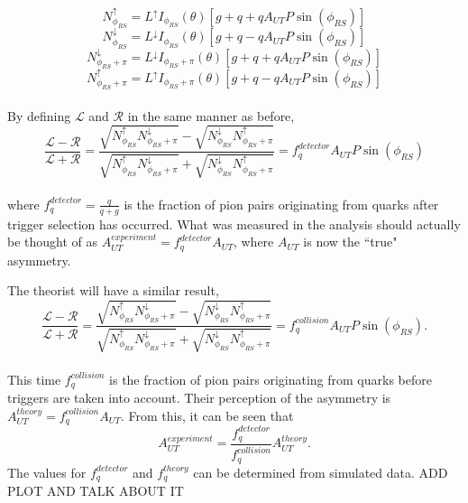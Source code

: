 \documentclass[letterpaper, abstract = on,listof=totoc, bibliography=totoc]{scrreprt}
\begin{document}
\begin{appendices}
\begin{equation}
\label{eq:nupTB}
N^\uparrow_{\phi_{RS}} = L^\uparrow I_{\phi_{RS}}(\theta)\left[g+q+qA_{UT}P\sin(\phi_{RS})\right]
\end{equation}
\begin{equation}
\label{eq:ndwnTB}
N^\downarrow_{\phi_{RS}} = L^\downarrow I_{\phi_{RS}}(\theta)\left[g+q-qA_{UT}P\sin(\phi_{RS})\right]
\end{equation}
\begin{equation}
\label{eq:ndwnphiTB}
N^\downarrow_{\phi_{RS}+\pi} = L^\downarrow I_{\phi_{RS}+\pi}(\theta)\left[g+q+qA_{UT}P\sin(\phi_{RS})\right]
\end{equation}
\begin{equation}
\label{eq:nupphiTB}
N^\uparrow_{\phi_{RS}+\pi} = L^\uparrow I_{\phi_{RS}+\pi}(\theta)\left[g+q-qA_{UT}P\sin(\phi_{RS})\right]
\end{equation}\\
By defining $\mathcal{L}$ and $\mathcal{R}$ in the same manner as before, 
\begin{equation}
\label{eq:crossRatioTB}
\frac{\mathcal{L} - \mathcal{R}}{\mathcal{L} +\mathcal{R}} = \frac{\sqrt{N^\uparrow_{\phi_{RS}}N^\downarrow_{\phi_{RS}+\pi}} - \sqrt{N^\downarrow_{\phi_{RS}}N^\uparrow_{\phi_{RS}+\pi}}}{\sqrt{N^\uparrow_{\phi_{RS}}N^\downarrow_{\phi_{RS}+\pi}} + \sqrt{N^\downarrow_{\phi_{RS}}N^\uparrow_{\phi_{RS}+\pi}}} =f_q^{detector}A_{UT}P\sin(\phi_{RS})
\end{equation}\\
where $f_q^{detector} = \frac{q}{q+g}$ is the fraction of pion pairs originating from quarks after trigger selection has occurred. What was measured in the analysis should actually be thought of as $A_{UT}^{experiment} = f_q^{detector}A_{UT}$, where $A_{UT}$ is now the ``true" asymmetry. 

The theorist will have a similar result,
\begin{equation}
\label{eq:crossRatioTBTh}
\frac{\mathcal{L} - \mathcal{R}}{\mathcal{L} +\mathcal{R}} = \frac{\sqrt{N^\uparrow_{\phi_{RS}}N^\downarrow_{\phi_{RS}+\pi}} - \sqrt{N^\downarrow_{\phi_{RS}}N^\uparrow_{\phi_{RS}+\pi}}}{\sqrt{N^\uparrow_{\phi_{RS}}N^\downarrow_{\phi_{RS}+\pi}} + \sqrt{N^\downarrow_{\phi_{RS}}N^\uparrow_{\phi_{RS}+\pi}}} =f_q^{collision}A_{UT}P\sin(\phi_{RS}).
\end{equation}\\
This time $f_q^{collision}$ is the fraction of pion pairs originating from quarks before triggers are taken into account. Their perception of the asymmetry is $A_{UT}^{theory} = f_q^{collision}A_{UT}$. 
From this, it can be seen that 
\begin{equation}
A_{UT}^{experiment}  = \frac{f_q^{detector}}{f_q^{collision}} A_{UT}^{theory}.
\end{equation}
The values for $f_q^{detector}$ and $f_q^{theory}$ can be determined from simulated data. ADD PLOT AND TALK ABOUT IT
 

\end{appendices}
\end{document}
